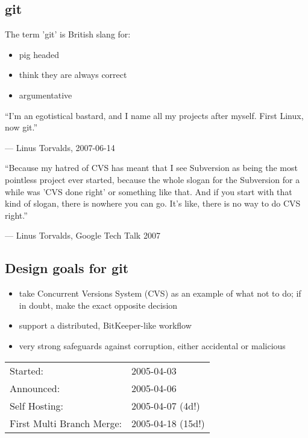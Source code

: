 \subsection{git}
\begin{frame}
  \subslidetitle
   The term 'git' is British slang for:
  \begin{itemize}
    \item pig headed
    \item think they are always correct
    \item argumentative
  \end{itemize}

  \epigraph{``I'm an egotistical bastard, and I name all my projects after myself. First Linux, now git.''}
       {--- Linus Torvalds, 2007-06-14}
    \epigraph{``Because my hatred of CVS has meant that I see Subversion as being the most pointless project ever started, because the whole slogan for the Subversion for a while was 'CVS done right' or something like that. And if you start with that kind of slogan, there is nowhere you can go. It's like, there is no way to do CVS right.''}
      {--- Linus Torvalds, Google Tech Talk 2007}
\end{frame}

\subsection{Design goals for git}
\begin{frame}
  \subslidetitle
  \begin{itemize}
    \item take Concurrent Versions System (CVS) as an example of what not to do; if in doubt, make the exact opposite decision
    \pause
    \item support a distributed, BitKeeper-like workflow
    \pause
    \item very strong safeguards against corruption, either accidental or malicious
    \pause
  \end{itemize}

  \vspace{2em}
  \begin{tabular}{ll}
    Started: & 2005-04-03 \\
    \pause
    Announced: &2005-04-06 \\
    \pause
    Self Hosting: & 2005-04-07 (4d!) \\
    \pause
    First Multi Branch Merge: & 2005-04-18 (15d!)
  \end{tabular}

\end{frame}

